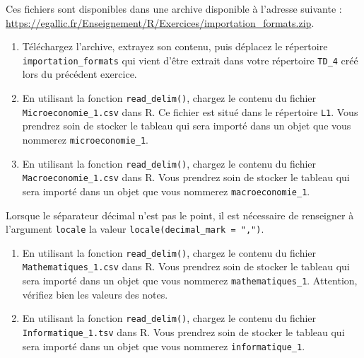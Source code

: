 \documentclass[
  11pt,
]{book}
\providecommand{\tightlist}{%
  \setlength{\itemsep}{0pt}\setlength{\parskip}{0pt}}
\numberwithin{equation}{section}
\numberwithin{countremarque}{section}
\newenvironment{greenbox}{
  \begin{tcolorbox}[breakable, colback=vert,coltext=black,
                  colframe=grisfonce]}
 {\end{tcolorbox}}
\begin{document}
Ces fichiers sont disponibles dans une archive disponible à l'adresse suivante : \url{https://egallic.fr/Enseignement/R/Exercices/importation_formats.zip}.

\begin{greenbox}

\begin{enumerate}
\def\labelenumi{\arabic{enumi}.}
\setcounter{enumi}{2}
\tightlist
\item
  Téléchargez l'archive, extrayez son contenu, puis déplacez le répertoire \texttt{importation\_formats} qui vient d'être extrait dans votre répertoire \texttt{TD\_4} créé lors du précédent exercice.
\item
  En utilisant la fonction \texttt{read\_delim()}, chargez le contenu du fichier \texttt{Microeconomie\_1.csv} dans R. Ce fichier est situé dans le répertoire \texttt{L1}. Vous prendrez soin de stocker le tableau qui sera importé dans un objet que vous nommerez \texttt{microeconomie\_1}.
\item
  En utilisant la fonction \texttt{read\_delim()}, chargez le contenu du fichier \texttt{Macroeconomie\_1.csv} dans R. Vous prendrez soin de stocker le tableau qui sera importé dans un objet que vous nommerez \texttt{macroeconomie\_1}.
\end{enumerate}

\end{greenbox}

Lorsque le séparateur décimal n'est pas le point, il est nécessaire de renseigner à l'argument \texttt{locale} la valeur \texttt{locale(decimal\_mark\ =\ ",")}.

\begin{greenbox}

\begin{enumerate}
\def\labelenumi{\arabic{enumi}.}
\setcounter{enumi}{5}
\tightlist
\item
  En utilisant la fonction \texttt{read\_delim()}, chargez le contenu du fichier \texttt{Mathematiques\_1.csv} dans R. Vous prendrez soin de stocker le tableau qui sera importé dans un objet que vous nommerez \texttt{mathematiques\_1}. Attention, vérifiez bien les valeurs des notes.
\item
  En utilisant la fonction \texttt{read\_delim()}, chargez le contenu du fichier \texttt{Informatique\_1.tsv} dans R. Vous prendrez soin de stocker le tableau qui sera importé dans un objet que vous nommerez \texttt{informatique\_1}.
\end{enumerate}

\end{greenbox}
\end{document}
